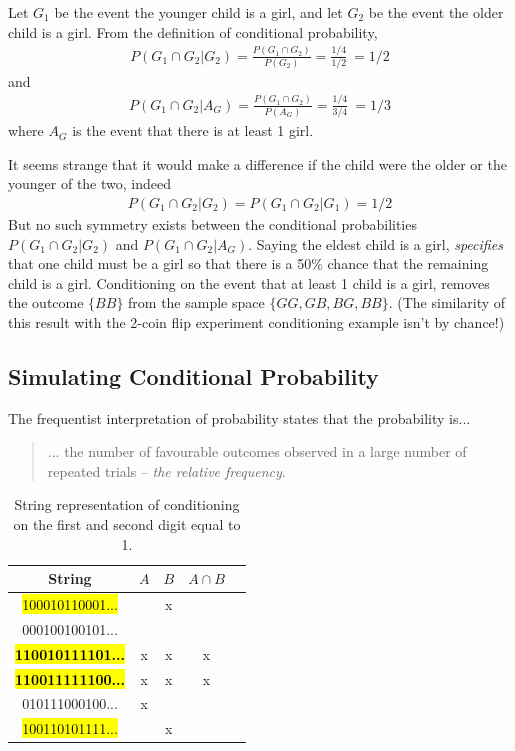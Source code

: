 Let \(G_{1}\) be the event the younger child is a girl,
and let \(G_{2}\) be the event the older child is a girl. 
From the definition of conditional probability,
\begin{align}
P\left( G_{1} \cap G_{2} | G_{2} \right) = 
\frac{P\left( G_{1} \cap G_{2} \right)}{P\left( G_{2} \right)} = \frac{1/4}{1/2}\  = 1/2
\end{align}
and
\begin{align}
P\left( G_{1} \cap G_{2} | A_{G} \right) = 
\frac{P\left( G_{1} \cap G_{2} \right)}{P\left( A_{G} \right)} = \frac{1/4}{3/4}\  = 1/3
\end{align}
where \(A_{G}\) is the event that there is at least 1 girl.

It seems strange that it would make a difference if the child were the
older or the younger of the two, 
indeed
\begin{align}
P\left( G_{1} \cap G_{2} | G_{2} \right) = P\left( G_{1} \cap G_{2} | G_{1} \right) = 1/2
\end{align}
But no such symmetry exists between the conditional probabilities
\(P\left( G_{1} \cap G_{2} | G_{2} \right)\) and
\(P\left( G_{1} \cap G_{2} | A_{G} \right)\). 
Saying the eldest child is a girl, 
\emph{specifies} that one child must be a girl so that there is a 50\% chance that the remaining child is a girl. 
Conditioning on the event that at least 1 child is a girl, 
removes the outcome \(\{ BB\}\) from the sample space \(\{GG, GB, BG, BB\}\). 
(The similarity of this result with the 2-coin flip experiment conditioning example isn't by chance!)

\subsection{Simulating Conditional Probability}

The frequentist interpretation of probability states that the probability is...

\begin{quote}
... the number of favourable outcomes observed in a large number of repeated trials 
-- \emph{the relative frequency}.
\end{quote}

\begin{table}[h!]
\centering
\begin{tabular}{| c | c | c | c | c |}
\hline
String & \(A\) & \(B\) & \(A\cap B\) \\\hline
\hl{100010110001...} &    & x &   \\\hline
000100100101... &    &    &   \\\hline
\hl{\textbf{110010111101...}} & x & x & x \\\hline
\hl{\textbf{110011111100...}} & x & x & x \\\hline
010111000100... & x &    &    \\\hline
\hl{100110101111...} &    & x &    \\\hline
\end{tabular}
\caption{%
String representation of conditioning on the first and second digit equal to 1.
}
\end{table}


